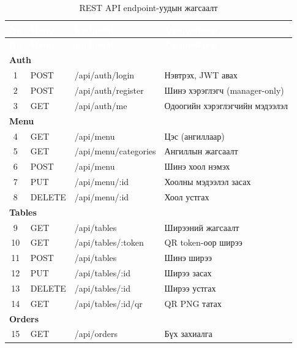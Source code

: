 \footnotesize
\begin{longtable}{|c|l|p{4cm}|p{5.5cm}|}
\caption{REST API endpoint-уудын жагсаалт} \label{tab:api} \\
\hline
\rowcolor{TableHdr}
\textcolor{white}{\textbf{No}} &
\textcolor{white}{\textbf{Метод}} &
\textcolor{white}{\textbf{Endpoint}} &
\textcolor{white}{\textbf{Тодорхойлолт}} \\ \hline
\endfirsthead
\hline
\rowcolor{TableHdr}
\textcolor{white}{\textbf{No}} &
\textcolor{white}{\textbf{Метод}} &
\textcolor{white}{\textbf{Endpoint}} &
\textcolor{white}{\textbf{Тодорхойлолт}} \\ \hline
\endhead

\multicolumn{4}{|l|}{\textbf{Auth}} \\ \hline
1 & POST & /api/auth/login & Нэвтрэх, JWT авах \\ \hline
\rowcolor{LightBlue}
2 & POST & /api/auth/register & Шинэ хэрэглэгч (manager-only) \\ \hline
3 & GET  & /api/auth/me & Одоогийн хэрэглэгчийн мэдээлэл \\ \hline
\multicolumn{4}{|l|}{\textbf{Menu}} \\ \hline
4 & GET  & /api/menu & Цэс (ангиллаар) \\ \hline
\rowcolor{LightBlue}
5 & GET  & /api/menu/categories & Ангиллын жагсаалт \\ \hline
6 & POST & /api/menu & Шинэ хоол нэмэх \\ \hline
\rowcolor{LightBlue}
7 & PUT  & /api/menu/:id & Хоолны мэдээлэл засах \\ \hline
8 & DELETE & /api/menu/:id & Хоол устгах \\ \hline
\multicolumn{4}{|l|}{\textbf{Tables}} \\ \hline
\rowcolor{LightBlue}
9 & GET  & /api/tables & Ширээний жагсаалт \\ \hline
10 & GET  & /api/tables/:token & QR token-оор ширээ \\ \hline
\rowcolor{LightBlue}
11 & POST & /api/tables & Шинэ ширээ \\ \hline
12 & PUT  & /api/tables/:id & Ширээ засах \\ \hline
\rowcolor{LightBlue}
13 & DELETE & /api/tables/:id & Ширээ устгах \\ \hline
14 & GET  & /api/tables/:id/qr & QR PNG татах \\ \hline
\multicolumn{4}{|l|}{\textbf{Orders}} \\ \hline
\rowcolor{LightBlue}
15 & GET  & /api/orders & Бүх захиалга \\ \hline

\end{longtable}

